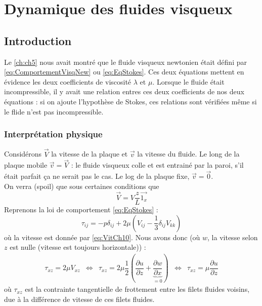 \chapter{Dynamique des fluides visqueux}
\section{Introduction}
Le \autoref{ch:ch5} nous avait montré que le fluide visqueux newtonien était défini par \autoref{eq:ComportementVisqNew} ou \autoref{eq:EqStokes}. Ces deux équations mettent 
en évidence les deux coefficients de viscosité $\lambda$ et $\mu$. Lorsque le fluide 
était incompressible, il y avait une relation entres ces deux coefficients de nos deux
équations : si on ajoute l'hypothèse de Stokes, ces relations sont vérifiées même si le
flide n'est pas incompressible.


	\subsection{Interprétation physique}
	Considérons $\vec{V}$ la vitesse de la plaque et $\vec{v}$ la vitesse du fluide. Le
	long de la plaque mobile $\vec{v}=\vec{V}$ : le fluide visqueux colle et est entrainé
	par la paroi, s'il était parfait ça ne serait pas le cas. Le log de la plaque fixe,
	$\vec{v}=\vec{0}$.\\
	
	On verra (spoil) que sous certaines conditions que 
	\begin{equation}
	\vec{V} = V\frac{z}{L}\vec{1_x}
	\label{eq:VitCh10}
	\end{equation}
	Reprenons la loi de comportement \autoref{eq:EqStokes} :
	\begin{equation}
	\tau_{ij} = -p\delta_{ij} + 2\mu\left(V_{ij} - \frac{1}{3}\delta_{ij}V_{kk}\right)
	\end{equation}
	où la vitesse est donnée par \autoref{eq:VitCh10}. Nous avons donc (où $w$, la vitesse
	selon $z$ est nulle (vitesse est toujours horizontale)) :
	\begin{equation}
	\begin{array}{ccccc}
	\tau_{xz} = 2\mu V_{xz} &\Leftrightarrow & \tau_{xz} = 2\mu\dfrac{1}{2}\left(\dfrac{
	\partial u}{\partial z}+\underbrace{\dfrac{\partial w}{\partial x}}_{=0}\right) &
	\Leftrightarrow & \tau_{xz}	= \mu \dfrac{\partial u}{\partial z}
	\end{array}
	\end{equation}
	où $\tau_{xz}$ est la contrainte tangentielle de frottement entre les filets fluides
	voisins, due à la différence de vitesse de ces filets fluides.
	

